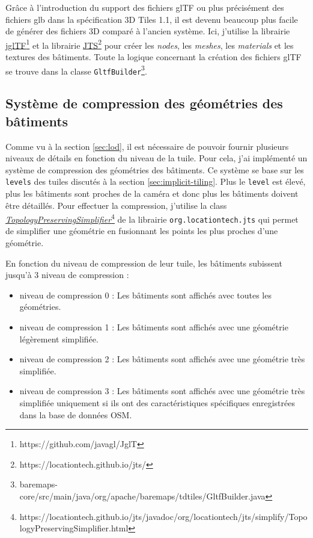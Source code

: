 Grâce à l'introduction du support des fichiers glTF ou plus précisément des fichiers glb dans la spécification 3D Tiles 1.1, il est devenu beaucoup plus facile de générer des fichiers 3D comparé à l'ancien système. Ici, j'utilise la librairie \href{https://github.com/javagl/JglTF}{jglTF}\footnote{https://github.com/javagl/JglT} et la librairie \href{https://locationtech.github.io/jts/}{JTS}\footnote{https://locationtech.github.io/jts/} pour créer les \textit{nodes}, les \textit{meshes}, les \textit{materials} et les textures des bâtiments. Toute la logique concernant la création des fichiers glTF se trouve dans la classe \texttt{GltfBuilder}\footnote{baremaps-core/src/main/java/org/apache/baremaps/tdtiles/GltfBuilder.java}.

\subsection{Système de compression des géométries des bâtiments}

Comme vu à la section \ref{sec:lod}, il est nécessaire de pouvoir fournir plusieurs niveaux de détails en fonction du niveau de la tuile. Pour cela, j'ai implémenté un système de compression des géométries des bâtiments. Ce système se base sur les \texttt{levels} des tuiles discutés à la section \ref{sec:implicit-tiling}. Plus le \texttt{level} est élevé, plus les bâtiments sont proches de la caméra et donc plus les bâtiments doivent être détaillés. Pour effectuer la compression, j'utilise la class \href{https://locationtech.github.io/jts/javadoc/org/locationtech/jts/simplify/TopologyPreservingSimplifier.html}{\textit{TopologyPreservingSimplifier}}\footnote{https://locationtech.github.io/jts/javadoc/org/locationtech/jts/simplify/TopologyPreservingSimplifier.html} de la librairie \texttt{org.locationtech.jts} qui permet de simplifier une géométrie en fusionnant les points les plus proches d'une géométrie.

En fonction du niveau de compression de leur tuile, les bâtiments subissent jusqu'à 3 niveau de compression :

\begin{itemize}
    \item niveau de compression 0 : Les bâtiments sont affichés avec toutes les géométries.
    \item niveau de compression 1 : Les bâtiments sont affichés avec une géométrie légèrement simplifiée.
    \item niveau de compression 2 : Les bâtiments sont affichés avec une géométrie très simplifiée.
    \item niveau de compression 3 : Les bâtiments sont affichés avec une géométrie très simplifiée uniquement si ils ont des caractéristiques spécifiques enregistrées dans la base de données OSM.
\end{itemize}

